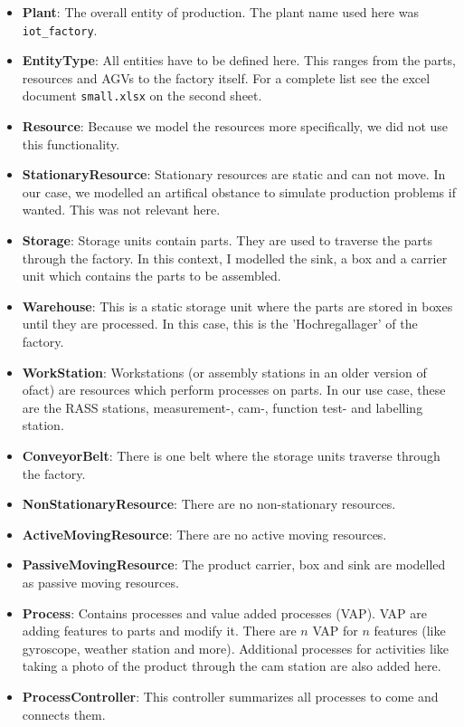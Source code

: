 \begin{itemize}
  \item \textbf{Plant}: The overall entity of production. The plant name used here was \texttt{iot\_factory}.
  \item \textbf{EntityType}: All entities have to be defined here. This ranges from the parts, resources and AGVs to the factory itself. For a complete list see the excel document \texttt{small.xlsx} on the second sheet.
  \item \textbf{Resource}: Because we model the resources more specifically, we did not use this functionality.
  \item \textbf{StationaryResource}: Stationary resources are static and can not move. In our case, we modelled an artifical obstance to simulate production problems if wanted. This was not relevant here.
  \item \textbf{Storage}: Storage units contain parts. They are used to traverse the parts through the factory. In this context, I modelled the sink, a box and a carrier unit which contains the parts to be assembled.
  \item \textbf{Warehouse}: This is a static storage unit where the parts are stored in boxes until they are processed. In this case, this is the 'Hochregallager' of the factory.
  \item \textbf{WorkStation}: Workstations (or assembly stations in an older version of ofact) are resources which perform processes on parts. In our use case, these are the RASS stations, measurement-, cam-, function test- and labelling station.
  \item \textbf{ConveyorBelt}: There is one belt where the storage units traverse through the factory.
  \item \textbf{NonStationaryResource}: There are no non-stationary resources.
  \item \textbf{ActiveMovingResource}: There are no active moving resources.
  \item \textbf{PassiveMovingResource}: The product carrier, box and sink are modelled as passive moving resources.
  \item \textbf{Process}: Contains processes and value added processes (VAP). VAP are adding features to parts and modify it. There are \(n\) VAP for \(n\) features (like gyroscope, weather station and more). Additional processes for activities like taking a photo of the product through the cam station are also added here.
  \item \textbf{ProcessController}: This controller summarizes all processes to come and connects them.

\end{itemize}
